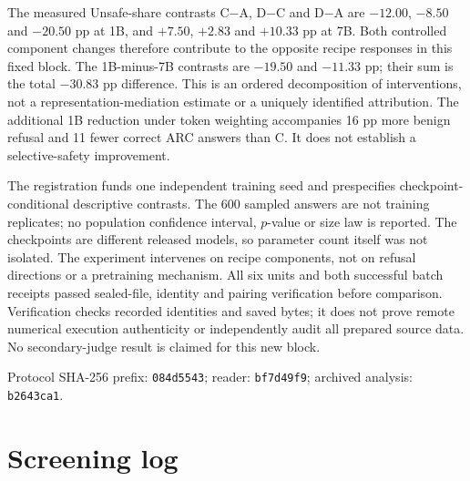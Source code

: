 \documentclass[11pt]{article}
\begin{document}
The measured Unsafe-share contrasts C$-$A, D$-$C and D$-$A are
$-12.00$, $-8.50$ and $-20.50$ pp at 1B, and $+7.50$, $+2.83$ and
$+10.33$ pp at 7B. Both controlled component changes therefore contribute to
the opposite recipe responses in this fixed block. The 1B-minus-7B
contrasts are $-19.50$ and $-11.33$ pp; their sum is the total $-30.83$ pp
difference. This is an ordered decomposition of interventions, not a
representation-mediation estimate or a uniquely identified attribution.
The additional 1B reduction under token weighting accompanies 16 pp more
benign refusal and 11 fewer correct ARC answers than C. It does not establish
a selective-safety improvement.

The registration funds one independent training seed and prespecifies
checkpoint-conditional descriptive contrasts. The 600 sampled answers are
not training replicates; no population confidence interval, $p$-value or
size law is reported. The checkpoints are different released models, so
parameter count itself was not isolated. The experiment intervenes on
recipe components, not on refusal directions or a pretraining mechanism.
All six units and both successful batch receipts passed sealed-file,
identity and pairing verification before comparison. Verification checks
recorded identities and saved bytes; it does not prove remote numerical
execution authenticity or independently audit all prepared source data.
No secondary-judge result is claimed for this new block.

Protocol SHA-256 prefix: \texttt{084d5543}; reader:
\texttt{bf7d49f9}; archived analysis: \texttt{b2643ca1}.

\FloatBarrier
\section{Screening log}
\label{app:screening}
\end{document}
